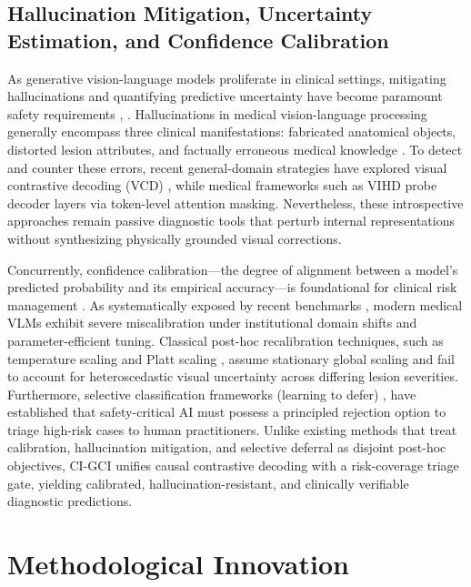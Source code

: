\documentclass[journal,twoside,web]{ieeecolor}
\begin{document}
\subsection{Hallucination Mitigation, Uncertainty Estimation, and Confidence Calibration}
As generative vision-language models proliferate in clinical settings, mitigating hallucinations and quantifying predictive uncertainty have become paramount safety requirements \cite{medhalltune2024}, \cite{sharifdeen2024mvcbench}. Hallucinations in medical vision-language processing generally encompass three clinical manifestations: fabricated anatomical objects, distorted lesion attributes, and factually erroneous medical knowledge \cite{medhalltune2024}. To detect and counter these errors, recent general-domain strategies have explored visual contrastive decoding (VCD) \cite{liuh2024}, while medical frameworks such as VIHD \cite{chen2024vihd} probe decoder layers via token-level attention masking. Nevertheless, these introspective approaches remain passive diagnostic tools that perturb internal representations without synthesizing physically grounded visual corrections.

Concurrently, confidence calibration---the degree of alignment between a model's predicted probability and its empirical accuracy---is foundational for clinical risk management \cite{guo2017}. As systematically exposed by recent benchmarks \cite{sharifdeen2024mvcbench}, modern medical VLMs exhibit severe miscalibration under institutional domain shifts and parameter-efficient tuning. Classical post-hoc recalibration techniques, such as temperature scaling and Platt scaling \cite{guo2017}, assume stationary global scaling and fail to account for heteroscedastic visual uncertainty across differing lesion severities. Furthermore, selective classification frameworks (learning to defer) \cite{geifman2017selective}, \cite{mozannar2020defer} have established that safety-critical AI must possess a principled rejection option to triage high-risk cases to human practitioners. Unlike existing methods that treat calibration, hallucination mitigation, and selective deferral as disjoint post-hoc objectives, CI-GCI unifies causal contrastive decoding with a risk-coverage triage gate, yielding calibrated, hallucination-resistant, and clinically verifiable diagnostic predictions.

\section{Methodological Innovation}
\label{sec:methodology}
\end{document}
